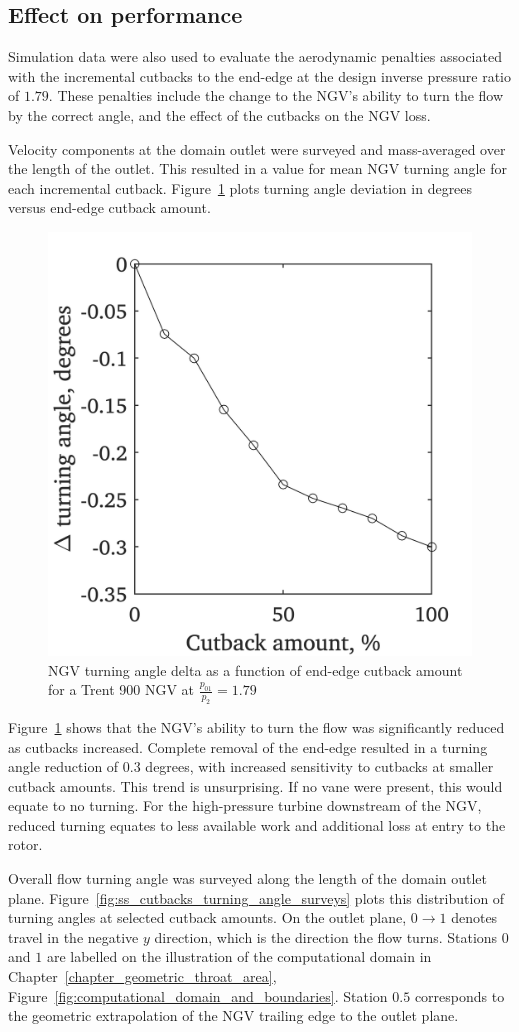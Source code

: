 \documentclass[a4paper, 11pt, oneside]{report}
\begin{document}
\subsection{Effect on performance}

Simulation data were also used to evaluate the aerodynamic penalties associated with the incremental cutbacks to the end-edge at the design inverse pressure ratio of $1.79$. These penalties include the change to the NGV's ability to turn the flow by the correct angle, and the effect of the cutbacks on the NGV loss.

Velocity components at the domain outlet were surveyed and mass-averaged over the length of the outlet. This resulted in a value for mean NGV turning angle for each incremental cutback. Figure~\ref{fig:ss_cutbacks_vs_turning_angles} plots turning angle deviation in degrees versus end-edge cutback amount.

\begin{figure}[H]
	\centering
	\includegraphics[width=.45\textwidth]{figs/ss_cutbacks_vs_turning_angles.png}
	\caption{NGV turning angle delta as a function of end-edge cutback amount for a Trent 900 NGV at $\frac{p_{01}}{p_2}=1.79$}
    \label{fig:ss_cutbacks_vs_turning_angles}
\end{figure}

Figure~\ref{fig:ss_cutbacks_vs_turning_angles} shows that the NGV's ability to turn the flow was significantly reduced as cutbacks increased. Complete removal of the end-edge resulted in a turning angle reduction of $0.3$ degrees, with increased sensitivity to cutbacks at smaller cutback amounts. This trend is unsurprising. If no vane were present, this would equate to no turning. For the high-pressure turbine downstream of the NGV, reduced turning equates to less available work and additional loss at entry to the rotor.

Overall flow turning angle was surveyed along the length of the domain outlet plane. Figure~\ref{fig:ss_cutbacks_turning_angle_surveys} plots this distribution of turning angles at selected cutback amounts. On the outlet plane, $0\rightarrow1$ denotes travel in the negative $y$ direction, which is the direction the flow turns. Stations $0$ and $1$ are labelled on the illustration of the computational domain in Chapter~\ref{chapter_geometric_throat_area}, Figure~\ref{fig:computational_domain_and_boundaries}. Station $0.5$ corresponds to the geometric extrapolation of the NGV trailing edge to the outlet plane.
\end{document}
